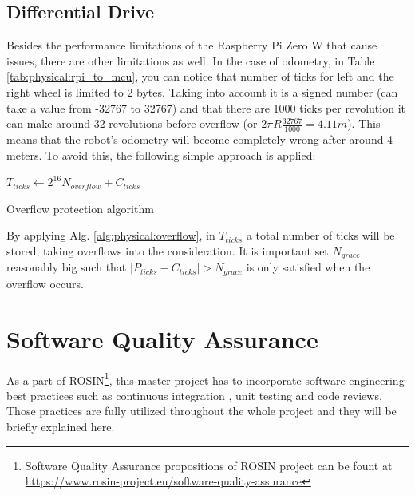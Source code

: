 \subsection{Differential Drive}
Besides the performance limitations of the Raspberry Pi Zero W that cause issues, there are other limitations as well. In the case of odometry, in Table \ref{tab:physical:rpi_to_mcu}, you can notice that number of ticks for left and the right wheel is limited to 2 bytes. Taking into account it is a signed number (can take a value from -32767 to 32767) and that there are 1000 ticks per revolution it can make around 32 revolutions before overflow (or $ 2 \pi R \frac{32767}{1000} = 4.11m $). This means that the robot's odometry will become completely wrong after around 4 meters. To avoid this, the following simple approach is applied:

\vspace*{.4cm}
\begin{algorithm}[H]

$ T_{ticks} \leftarrow 2^{16} N_{overflow} + C_{ticks} $\;

\caption{Overflow protection algorithm}
\label{alg:physical:overflow}
\end{algorithm}
\vspace*{.4cm}

By applying Alg. \ref{alg:physical:overflow}, in $ T_{ticks} $ a total number of ticks will be stored, taking overflows into the consideration. It is important set $ N_{grace} $ reasonably big such that $ |P_{ticks} - C_{ticks}| > N_{grace} $ is only satisfied when the overflow occurs.

\section{Software Quality Assurance}
As a part of ROSIN\footnote{Software Quality Assurance propositions of ROSIN project can be fount at \url{https://www.rosin-project.eu/software-quality-assurance}}, this master project has to incorporate software engineering best practices such as continuous integration \cite{meyer_continuous_2014}, unit testing and code reviews. Those practices are fully utilized throughout the whole project and they will be briefly explained here.

